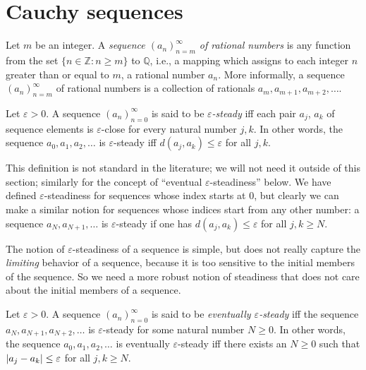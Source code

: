 \section{Cauchy sequences}

\begin{definition}[Sequences]\label{5.1.1}
Let \(m\) be an integer.
A \emph{sequence \((a_n)_{n = m}^{\infty}\) of rational numbers} is any function from the set \(\{n \in \mathds{Z} : n \geq m\}\) to \(\mathds{Q}\), i.e., a mapping which assigns to each integer \(n\) greater than or equal to \(m\), a rational number \(a_n\).
More informally, a sequence \((a_n)_{n = m}^{\infty}\) of rational numbers is a collection of rationals \(a_m, a_{m + 1}, a_{m + 2}, \dots\).
\end{definition}

\setcounter{theorem}{2}
\begin{definition}\label{5.1.3}
Let \(\varepsilon > 0\).
A sequence \((a_n)_{n = 0}^{\infty}\) is said to be \emph{\(\varepsilon\)-steady} iff each pair \(a_j\), \(a_k\) of sequence elements is \(\varepsilon\)-close for every natural number \(j, k\).
In other words, the sequence \(a_0, a_1, a_2, \dots\) is \(\varepsilon\)-steady iff \(d(a_j, a_k) \leq \varepsilon\) for all \(j, k\).
\end{definition}

\begin{remark}\label{5.1.4}
This definition is not standard in the literature;
we will not need it outside of this section;
similarly for the concept of ``eventual \(\varepsilon\)-steadiness'' below.
We have defined \(\varepsilon\)-steadiness for sequences whose index starts at \(0\), but clearly we can make a similar notion for sequences whose indices start from any other number:
a sequence \(a_N, a_{N + 1}, \dots\) is \(\varepsilon\)-steady if one has \(d(a_j, a_k) \leq \varepsilon\) for all \(j, k \geq N\).
\end{remark}

\begin{note}
The notion of \(\varepsilon\)-steadiness of a sequence is simple, but does not really capture the \emph{limiting} behavior of a sequence, because it is too sensitive to the initial members of the sequence.
So we need a more robust notion of steadiness that does not care about the initial members of a sequence.
\end{note}

\setcounter{theorem}{5}
\begin{definition}\label{5.1.6}
Let \(\varepsilon > 0\).
A sequence \((a_n)_{n = 0}^{\infty}\) is said to be \emph{eventually \(\varepsilon\)-steady} iff the sequence \(a_N, a_{N + 1}, a_{N + 2}, \dots\) is \(\varepsilon\)-steady for some natural number \(N \geq 0\).
In other words, the sequence \(a_0, a_1, a_2, \dots\) is eventually \(\varepsilon\)-steady iff there exists an \(N \geq 0\) such that \(\abs*{a_j - a_k} \leq \varepsilon\) for all \(j, k \geq N\).
\end{definition}

